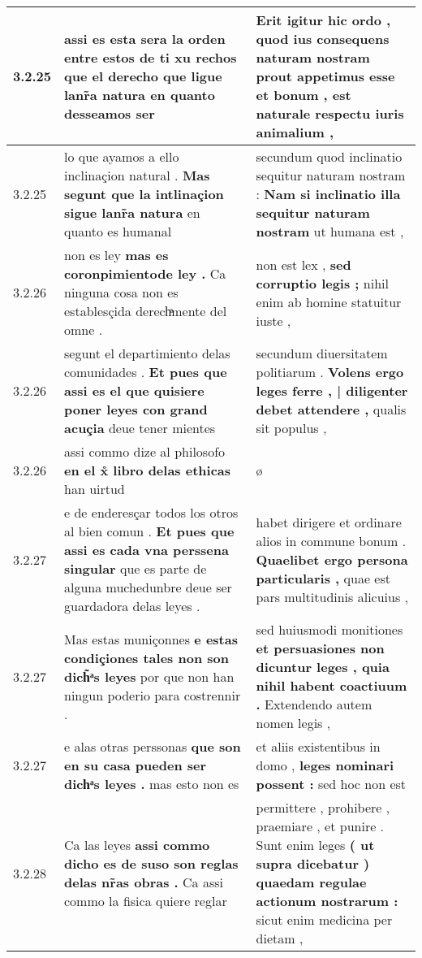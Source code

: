\begin{tabular}{|p{1cm}|p{6.5cm}|p{6.5cm}|}
3.2.25 & assi es esta sera la orden entre estos de ti xu rechos \textbf{ que el derecho que ligue lanr̃a natura } en quanto desseamos ser & Erit igitur hic ordo , \textbf{ quod ius consequens naturam nostram } prout appetimus esse et bonum , est naturale respectu iuris animalium , \\\hline
3.2.25 & lo que ayamos a ello inclinaçion natural . \textbf{ Mas segunt que la intlinaçion sigue lanr̃a natura } en quanto es humanal & secundum quod inclinatio sequitur naturam nostram : \textbf{ Nam si inclinatio illa sequitur naturam nostram } ut humana est , \\\hline
3.2.26 & non es ley \textbf{ mas es coronpimientode ley . } Ca ninguna cosa non es establesçida derechͣmente del omne . & non est lex , \textbf{ sed corruptio legis ; } nihil enim ab homine statuitur iuste , \\\hline
3.2.26 & segunt el departimiento delas comunidades . \textbf{ Et pues que assi es el que quisiere poner leyes con grand acuçia } deue tener mientes & secundum diuersitatem politiarum . \textbf{ Volens ergo leges ferre , | diligenter debet attendere , } qualis sit populus , \\\hline
3.2.26 & assi commo dize al philosofo \textbf{ en el x̊ libro delas ethicas } han uirtud & ø \\\hline
3.2.27 & e de enderesçar todos los otros al bien comun . \textbf{ Et pues que assi es cada vna perssena singular } que es parte de alguna muchedunbre deue ser guardadora delas leyes . & habet dirigere et ordinare alios in commune bonum . \textbf{ Quaelibet ergo persona particularis , } quae est pars multitudinis alicuius , \\\hline
3.2.27 & Mas estas muniçonnes \textbf{ e estas condiçiones tales non son dich̃ͣs leyes } por que non han ningun poderio para costrennir . & sed huiusmodi monitiones \textbf{ et persuasiones non dicuntur leges , quia nihil habent coactiuum . } Extendendo autem nomen legis , \\\hline
3.2.27 & e alas otras perssonas \textbf{ que son en su casa pueden ser dichͣs leyes . } mas esto non es & et aliis existentibus in domo , \textbf{ leges nominari possent : } sed hoc non est \\\hline
3.2.28 & Ca las leyes \textbf{ assi commo dicho es de suso son reglas delas nr̃as obras . } Ca assi commo la fisica quiere reglar & permittere , prohibere , praemiare , et punire . Sunt enim leges \textbf{ ( ut supra dicebatur ) quaedam regulae actionum nostrarum : } sicut enim medicina per dietam , \\\hline

\end{tabular}
